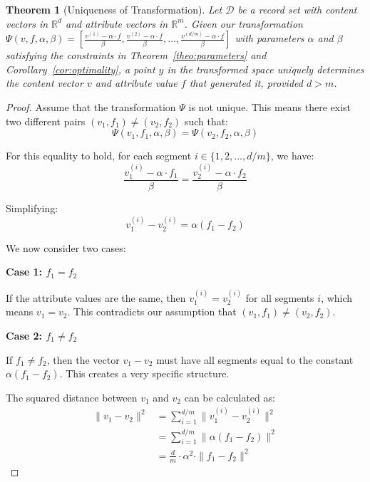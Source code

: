 \documentclass[numbers,sort]{article}
\newtheorem{theorem}{Theorem}
\begin{document}
\begin{theorem}[Uniqueness of Transformation]
\label{thm:uniqueness}
Let $\mathcal{D}$ be a record set with content vectors in $\mathbb{R}^d$ and attribute vectors in $\mathbb{R}^m$. Given our transformation $\Psi(v, f, \alpha, \beta) = [\frac{v^{(1)} - \alpha \cdot f}{\beta}, \frac{v^{(2)} - \alpha \cdot f}{\beta}, ..., \frac{v^{(d/m)} - \alpha \cdot f}{\beta}]$ with parameters $\alpha$ and $\beta$ satisfying the constraints in Theorem~\ref{theo:parameters} and Corollary~\ref{cor:optimality}, a point $y$ in the transformed space uniquely determines the content vector $v$ and attribute value $f$ that generated it, provided $d > m$.
\end{theorem}

\begin{proof}
Assume that the transformation $\Psi$ is not unique. This means there exist two different pairs $(v_1, f_1) \neq (v_2, f_2)$ such that:
\begin{equation}
\Psi(v_1, f_1, \alpha, \beta) = \Psi(v_2, f_2, \alpha, \beta)
\end{equation}

For this equality to hold, for each segment $i \in \{1, 2, \ldots, d/m\}$, we have:
\begin{equation}
\frac{v_1^{(i)} - \alpha \cdot f_1}{\beta} = \frac{v_2^{(i)} - \alpha \cdot f_2}{\beta}
\end{equation}

Simplifying:
\begin{equation}
v_1^{(i)} - v_2^{(i)} = \alpha(f_1 - f_2)
\end{equation}

We now consider two cases:

\textbf{Case 1: $f_1 = f_2$}

If the attribute values are the same, then $v_1^{(i)} = v_2^{(i)}$ for all segments $i$, which means $v_1 = v_2$. This contradicts our assumption that $(v_1, f_1) \neq (v_2, f_2)$.

\textbf{Case 2: $f_1 \neq f_2$}

If $f_1 \neq f_2$, then the vector $v_1 - v_2$ must have all segments equal to the constant $\alpha(f_1 - f_2)$. This creates a very specific structure.

The squared distance between $v_1$ and $v_2$ can be calculated as:
\begin{align}
\|v_1 - v_2\|^2 &= \sum_{i=1}^{d/m} \|v_1^{(i)} - v_2^{(i)}\|^2 \\
&= \sum_{i=1}^{d/m} \|\alpha(f_1 - f_2)\|^2 \\
&= \frac{d}{m} \cdot \alpha^2 \cdot \|f_1 - f_2\|^2
\end{align}


\end{proof}
\end{document}
